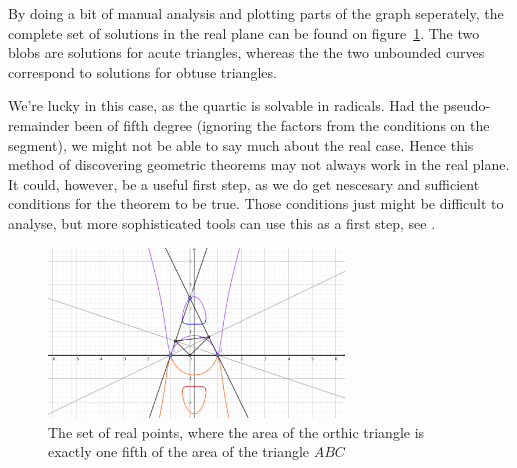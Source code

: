 \begin{example}
  By doing a bit of manual analysis and plotting parts of the graph seperately, the complete set of solutions in the real plane can be found on figure~\ref{fig:orthic_wow}. The two blobs are solutions for acute triangles, whereas the the two unbounded curves correspond to solutions for obtuse triangles.

  We're lucky in this case, as the quartic is solvable in radicals. Had the pseudo-remainder been of fifth degree (ignoring the factors from the conditions on the segment), we might not be able to say much about the real case. Hence this method of discovering geometric theorems may not always work in the real plane. It could, however, be a useful first step, as we do get nescesary and sufficient conditions for the theorem to be true. Those conditions just might be difficult to analyse, but more sophisticated tools can use this as a first step, see \cite{10.1145/2755996.2756646}.

\end{example}

\begin{figure}[t]
  \begin{center}
    \includegraphics[width=0.7\textwidth]{geogebra_orthic_wow.png}
  \end{center}
  \caption{The set of real points, where the area of the orthic triangle is exactly one fifth of the area of the triangle $ABC$} \label{fig:orthic_wow}
\end{figure}










